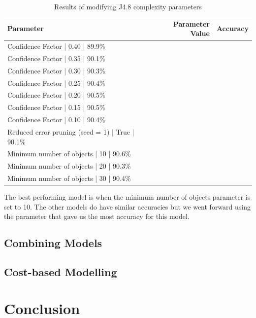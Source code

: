 \documentclass[a4paper,11pt]{article}
\begin{document}
\begin{table}[H]
  \begin{center}
    \begin{tabular}{l | r | r}
      Parameter & Parameter Value & Accuracy  \\ \hline
      Confidence Factor | 0.40 | 89.9\% \\
      Confidence Factor | 0.35 | 90.1\% \\
      Confidence Factor | 0.30 | 90.3\% \\
      Confidence Factor | 0.25 | 90.4\% \\
      Confidence Factor | 0.20 | 90.5\% \\
      Confidence Factor | 0.15 | 90.5\% \\
      Confidence Factor | 0.10 | 90.4\% \\
      Reduced error pruning (seed = 1) | True | 90.1\% \\
      Minimum number of objects  | 10 | 90.6\% \\
      Minimum number of objects  | 20 | 90.3\% \\
      Minimum number of objects  | 30 | 90.4\% \\
    \end{tabular}
  \end{center}
  \caption{Results of modifying J4.8 complexity parameters}
  \label{tab:J48Params}
\end{table}

The best performing model is when the minimum number of objects parameter is set to 10. The other models do have similar
accuracies but we went forward using the parameter that gave us the most accuracy for this model.

\subsection{Combining Models}

\subsection{Cost-based Modelling}

\section{Conclusion}
\end{document}
